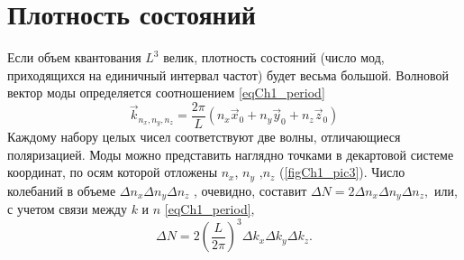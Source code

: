 \section{Плотность состояний}
Если объем квантования $L^3$ велик, плотность состояний (число мод,
приходящихся на единичный интервал частот) будет весьма
большой. Волновой вектор моды определяется соотношением
\eqref{eqCh1_period}
\begin{equation}
\vec{k}_{n_x, n_y, n_z} = \frac{2 \pi}{L}\left(n_x \vec{x}_0
+ n_y \vec{y}_0
+ n_z \vec{z}_0
\right)
\end{equation}
Каждому набору целых чисел соответствуют две волны, отличающиеся
поляризацией. Моды можно представить наглядно точками в декартовой
системе координат, по осям которой отложены  $n_x$, $n_y$  ,$n_z$
(\autoref{figCh1_pic3}). Число колебаний в объеме  
\(
\Delta n_x \Delta n_y \Delta n_z
\)
, очевидно, составит  
\(
\Delta N = 2 \Delta n_x \Delta n_y \Delta n_z,
\)
или, с учетом связи  
между  $k$  и  $n$  \eqref{eqCh1_period},
\begin{equation}
\Delta N = 2 \left(\frac{L}{2 \pi} \right)^3 \Delta k_x \Delta k_y \Delta k_z.
\label{eqCh1_modenumber}
\end{equation}





